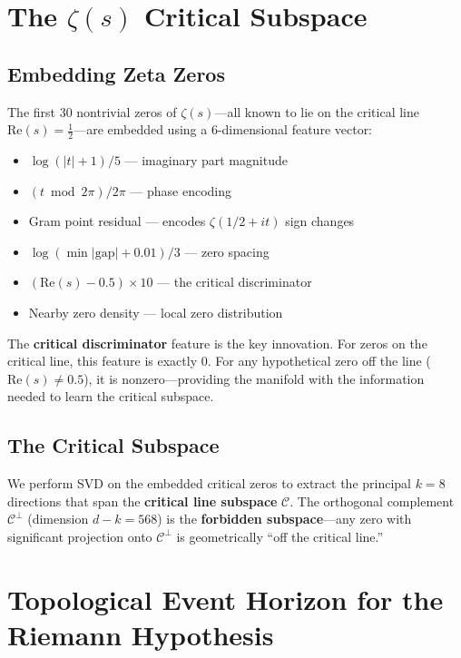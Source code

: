 \documentclass{article}
\begin{document}
\section{The $\zeta(s)$ Critical Subspace}
\label{sec:zeta}

\subsection{Embedding Zeta Zeros}

The first 30 nontrivial zeros of $\zeta(s)$---all known to lie on the
critical line $\mathrm{Re}(s) = \tfrac{1}{2}$---are embedded using a
6-dimensional feature vector:

\begin{itemize}
  \item $\log(|t| + 1) / 5$ --- imaginary part magnitude
  \item $(t \bmod 2\pi) / 2\pi$ --- phase encoding
  \item Gram point residual --- encodes $\zeta(1/2 + it)$ sign changes
  \item $\log(\min|\text{gap}| + 0.01) / 3$ --- zero spacing
  \item \textbf{$(\mathrm{Re}(s) - 0.5) \times 10$} --- the critical discriminator
  \item Nearby zero density --- local zero distribution
\end{itemize}

The \textbf{critical discriminator} feature is the key innovation.  For zeros
on the critical line, this feature is exactly 0.  For any hypothetical zero
off the line ($\mathrm{Re}(s) \neq 0.5$), it is nonzero---providing the
manifold with the information needed to learn the critical subspace.

\subsection{The Critical Subspace}

We perform SVD on the embedded critical zeros to extract the principal
$k=8$ directions that span the \textbf{critical line subspace} $\mathcal{C}$.
The orthogonal complement $\mathcal{C}^\perp$ (dimension $d-k = 568$) is the
\textbf{forbidden subspace}---any zero with significant projection onto
$\mathcal{C}^\perp$ is geometrically ``off the critical line.''

\section{Topological Event Horizon for the Riemann Hypothesis}
\label{sec:teh-riemann}
\end{document}
